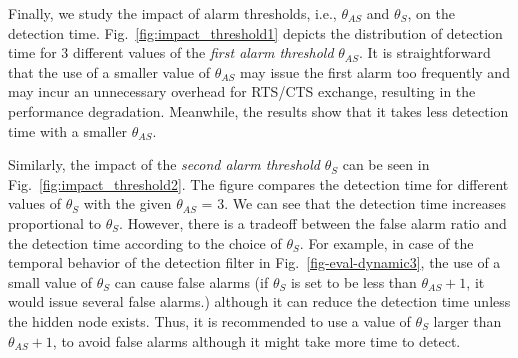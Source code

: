 Finally, we study the impact of alarm thresholds, i.e.,
$\theta_{AS}$ and $\theta_{S}$, on the detection time.
%
Fig.~\ref{fig:impact_threshold1} depicts the distribution of detection time
for 3 different values of the {\em first alarm threshold} $\theta_{AS}$.
%
It is straightforward that the use of a smaller value of $\theta_{AS}$ may
issue the first alarm too frequently and may incur an unnecessary overhead
for RTS/CTS exchange, resulting in the performance degradation. Meanwhile,
the results show that it takes less detection time with
a smaller $\theta_{AS}$.

Similarly, the impact of the {\em second alarm threshold} $\theta_{S}$
can be seen in Fig.~\ref{fig:impact_threshold2}. The figure compares
the detection time for different values of $\theta_{S}$ with
the given $\theta_{AS}$ = 3.
We can see that the detection time increases proportional to $\theta_{S}$.
However, there is a tradeoff between the false alarm ratio and
the detection time according to the choice of $\theta_{S}$.
For example, in case of the temporal behavior of the detection filter in
Fig.~\ref{fig-eval-dynamic3}, the use of a small value of $\theta_{S}$ can
cause false alarms (if $\theta_{S}$ is set to be less than $\theta_{AS}+1$,
it would issue several false alarms.)
although it can reduce the detection time unless the hidden node exists.
Thus, it is recommended to use a value of $\theta_{S}$ larger than
$\theta_{AS}+1$, to avoid false alarms
although it might take more time to detect.
%
